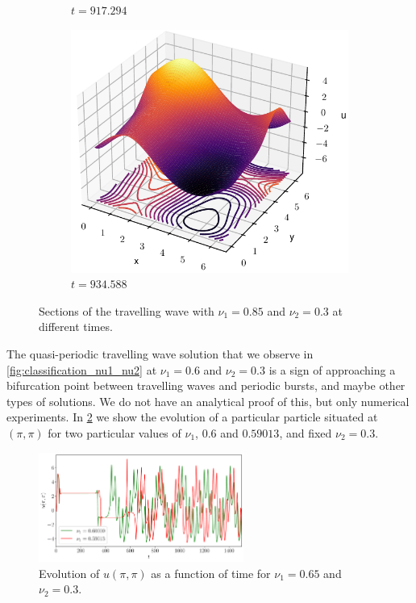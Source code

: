 \documentclass[twoside]{article}
\begin{document}
\begin{figure}[ht]
\begin{subfigure}[b]{0.33\textwidth}
    \caption{$t=917.294$}
  \end{subfigure}\hfill
  \begin{subfigure}[b]{0.33\textwidth}
    \includegraphics[width=\textwidth]{images/slice_nu1_0.85_nu2_0.3_time_934.588.pdf}
    \caption{$t=934.588$}
  \end{subfigure}
  \caption{Sections of the travelling wave with $\nu_1=0.85$ and $\nu_2=0.3$ at different times.}
  \label{fig:sections_tw}
\end{figure}

The quasi-periodic travelling wave solution that we observe in \cref{fig:classification_nu1_nu2} at $\nu_1=0.6$ and $\nu_2=0.3$ is a sign of approaching a bifurcation point between travelling waves and periodic bursts, and maybe other types of solutions. We do not have an analytical proof of this, but only numerical experiments. In \cref{fig:qp_tw} we show the evolution of a particular particle situated at $(\pi,\pi)$ for two particular values of $\nu_1$, $0.6$ and $0.59013$, and fixed $\nu_2=0.3$.

\begin{figure}[ht]
  \centering
  \includegraphics[width=0.6\textwidth]{images/qp_tw.pdf}
  \caption{Evolution of $u(\pi,\pi)$ as a function of time for $\nu_1=0.65$ and $\nu_2=0.3$.}
  \label{fig:qp_tw}
\end{figure}
\end{document}
